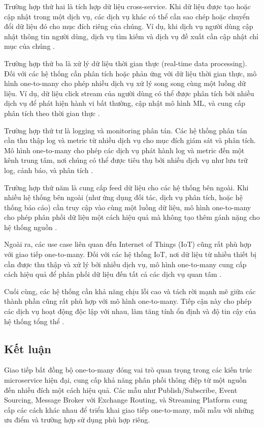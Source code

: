 Trường hợp thứ hai là tích hợp dữ liệu cross-service. Khi dữ liệu được tạo hoặc cập nhật trong một dịch vụ, các dịch vụ khác có thể cần sao chép hoặc chuyển đổi dữ liệu đó cho mục đích riêng của chúng. Ví dụ, khi dịch vụ người dùng cập nhật thông tin người dùng, dịch vụ tìm kiếm và dịch vụ đề xuất cần cập nhật chỉ mục của chúng \cite{richardson2019}.

Trường hợp thứ ba là xử lý dữ liệu thời gian thực (real-time data processing). Đối với các hệ thống cần phân tích hoặc phản ứng với dữ liệu thời gian thực, mô hình one-to-many cho phép nhiều dịch vụ xử lý song song cùng một luồng dữ liệu. Ví dụ, dữ liệu click stream của người dùng có thể được phân tích bởi nhiều dịch vụ để phát hiện hành vi bất thường, cập nhật mô hình ML, và cung cấp phân tích theo thời gian thực \cite{goodhope2012}.

Trường hợp thứ tư là logging và monitoring phân tán. Các hệ thống phân tán cần thu thập log và metric từ nhiều dịch vụ cho mục đích giám sát và phân tích. Mô hình one-to-many cho phép các dịch vụ phát hành log và metric đến một kênh trung tâm, nơi chúng có thể được tiêu thụ bởi nhiều dịch vụ như lưu trữ log, cảnh báo, và phân tích \cite{aksakalli2021}.

Trường hợp thứ năm là cung cấp feed dữ liệu cho các hệ thống bên ngoài. Khi nhiều hệ thống bên ngoài (như ứng dụng đối tác, dịch vụ phân tích, hoặc hệ thống báo cáo) cần truy cập vào cùng một luồng dữ liệu, mô hình one-to-many cho phép phân phối dữ liệu một cách hiệu quả mà không tạo thêm gánh nặng cho hệ thống nguồn \cite{beyer2018}.

Ngoài ra, các use case liên quan đến Internet of Things (IoT) cũng rất phù hợp với giao tiếp one-to-many. Đối với các hệ thống IoT, nơi dữ liệu từ nhiều thiết bị cần được thu thập và xử lý bởi nhiều dịch vụ, mô hình one-to-many cung cấp cách hiệu quả để phân phối dữ liệu đến tất cả các dịch vụ quan tâm \cite{indrasiri2020}.

Cuối cùng, các hệ thống cần khả năng chịu lỗi cao và tách rời mạnh mẽ giữa các thành phần cũng rất phù hợp với mô hình one-to-many. Tiếp cận này cho phép các dịch vụ hoạt động độc lập với nhau, làm tăng tính ổn định và độ tin cậy của hệ thống tổng thể \cite{fowler2002}.

\subsection{Kết luận}
Giao tiếp bất đồng bộ one-to-many đóng vai trò quan trọng trong các kiến trúc microservice hiện đại, cung cấp khả năng phân phối thông điệp từ một nguồn đến nhiều đích một cách hiệu quả. Các mẫu như Publish/Subscribe, Event Sourcing, Message Broker với Exchange Routing, và Streaming Platform cung cấp các cách khác nhau để triển khai giao tiếp one-to-many, mỗi mẫu với những ưu điểm và trường hợp sử dụng phù hợp riêng.

